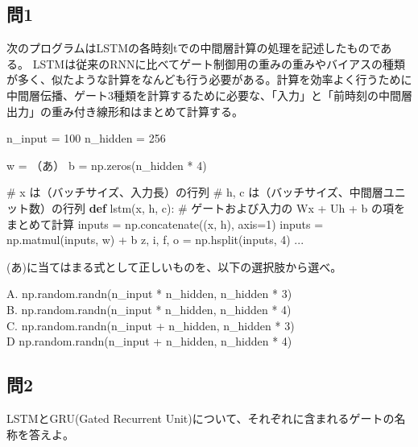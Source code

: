 \documentclass[
  letterpaper,
  DIV=11,
  numbers=noendperiod]{scrreprt}
\newenvironment{Shaded}{\begin{snugshade}}{\end{snugshade}}
\newcommand{\CommentTok}[1]{\textcolor[rgb]{0.37,0.37,0.37}{#1}}
\newcommand{\DecValTok}[1]{\textcolor[rgb]{0.68,0.00,0.00}{#1}}
\newcommand{\KeywordTok}[1]{\textcolor[rgb]{0.00,0.23,0.31}{\textbf{#1}}}
\newcommand{\NormalTok}[1]{\textcolor[rgb]{0.00,0.23,0.31}{#1}}
\newcommand{\OperatorTok}[1]{\textcolor[rgb]{0.37,0.37,0.37}{#1}}
\begin{document}
\subsection{問1}\label{ux554f1-6}

次のプログラムはLSTMの各時刻tでの中間層計算の処理を記述したものである。
LSTMは従来のRNNに比べてゲート制御用の重みの重みやバイアスの種類が多く、似たような計算をなんども行う必要がある。計算を効率よく行うために中間層伝播、ゲート3種類を計算するために必要な、「入力」と「前時刻の中間層出力」の重み付き線形和はまとめて計算する。

\begin{Shaded}
\begin{Highlighting}[]
\NormalTok{n\_input }\OperatorTok{=} \DecValTok{100}  
\NormalTok{n\_hidden }\OperatorTok{=} \DecValTok{256}

\NormalTok{w }\OperatorTok{=}\NormalTok{ （あ）  }
\NormalTok{b }\OperatorTok{=}\NormalTok{ np.zeros(n\_hidden }\OperatorTok{*} \DecValTok{4}\NormalTok{)}

\CommentTok{\# x は（バッチサイズ、入力長）の行列  }
\CommentTok{\# h, c は（バッチサイズ、中間層ユニット数）の行列  }
\KeywordTok{def}\NormalTok{ lstm(x, h, c):  }
    \CommentTok{\# ゲートおよび入力の Wx + Uh + b の項をまとめて計算  }
\NormalTok{    inputs }\OperatorTok{=}\NormalTok{ np.concatenate((x, h), axis}\OperatorTok{=}\DecValTok{1}\NormalTok{)  }
\NormalTok{    inputs }\OperatorTok{=}\NormalTok{ np.matmul(inputs, w) }\OperatorTok{+}\NormalTok{ b  }
\NormalTok{    z, i, f, o }\OperatorTok{=}\NormalTok{ np.hsplit(inputs, }\DecValTok{4}\NormalTok{)  }
\NormalTok{    ...}
\end{Highlighting}
\end{Shaded}

(あ)に当てはまる式として正しいものを、以下の選択肢から選べ。

A. np.random.randn(n\_input * n\_hidden, n\_hidden * 3)\\
B. np.random.randn(n\_input * n\_hidden, n\_hidden * 4)\\
C. np.random.randn(n\_input + n\_hidden, n\_hidden * 3)\\
D np.random.randn(n\_input + n\_hidden, n\_hidden * 4)

\subsection{問2}\label{ux554f2-4}

LSTMとGRU(Gated Recurrent
Unit)について、それぞれに含まれるゲートの名称を答えよ。
\end{document}
